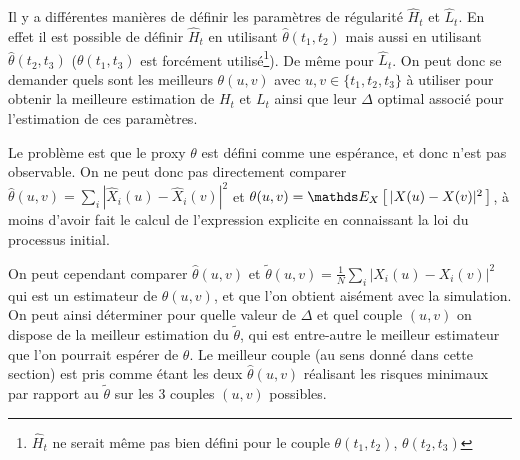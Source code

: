 
\newcommand{\thetaA}{\Theta_{1 \rightarrow \overset{3}{\underset {2}{}}}}
\newcommand{\cindexA}{_{1 \rightarrow \overset{3}{\underset {2}{}}}}
\newcommand{\thetaB}{\Theta_{\overset 1{\underset{2}{ }} \rightarrow3}}
\newcommand{\cindexB}{_{\overset 1{\underset{2}{ }} \rightarrow3}}
\newcommand{\thetaC}{\Theta_{1 \rightarrow 2 \rightarrow 3}}
\newcommand{\cindexC}{_{1 \rightarrow 2 \rightarrow 3}}
\newcommand{\notequiv}{\overset {\textsf{\faTimes}} \iff}
\newcommand{\yesequiv}{\overset {\textsf{\faCheck}} \iff}

Il y a différentes manières de définir les paramètres de régularité $\hat H_t$ et $\hat L_t$. En effet il est possible de définir $\hat H_t$ en utilisant $\hat \theta (t_1, t_2)$ mais aussi en utilisant $\hat \theta (t_2, t_3)$ ($\theta(t_1, t_3)$ est forcément utilisé\footnote{$\hat H_t$ ne serait même pas bien défini pour le couple $\theta(t_1, t_2)$, $\theta(t_2, t_3)$}). De même pour $\hat L_t$. On peut donc se demander quels sont les meilleurs $\theta(u,v)$ avec $u,v \in \{t_1, t_2, t_3\}$ à utiliser pour obtenir la meilleure estimation de $H_t$ et $L_t$ ainsi que leur $\Delta$ optimal associé pour l'estimation de ces paramètres.

\bigskip

Le problème est que le proxy $\theta$ est défini comme une espérance, et donc n'est pas observable. On ne peut donc pas directement comparer $\hat \theta(u,v) = \sum_i|\widehat X_i(u) - \widehat X_i(v)|^2$ et $\theta(u,v) = \esperanceloi X { |X(u) - X(v)|^2 }$, à moins d'avoir fait le calcul de l'expression explicite en connaissant la loi du processus initial.

\bigskip

On peut cependant comparer $\hat \theta(u,v)$ et $\widetilde \theta(u,v) = \frac 1 N \sum_i |X_i(u) - X_i(v)|^2$ qui est un estimateur de $\theta(u,v)$, et que l'on obtient aisément avec la simulation. On peut ainsi déterminer pour quelle valeur de $\Delta$ et quel couple $(u,v)$ on dispose de la meilleur estimation du $\tilde \theta$, qui est entre-autre le meilleur estimateur que l'on pourrait espérer de $\theta$. Le meilleur couple (au sens donné dans cette section) est pris comme étant les deux $\hat \theta(u,v)$ réalisant les risques minimaux par rapport au $\tilde \theta$ sur les 3 couples $(u,v)$ possibles.

